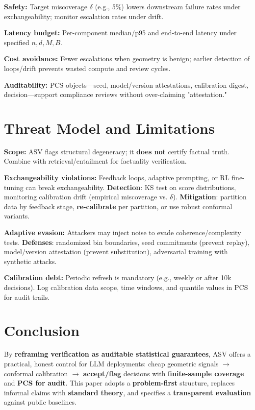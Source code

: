 \documentclass[11pt]{article}
\begin{document}
\textbf{Safety:} Target miscoverage $\delta$ (e.g., 5\%) lowers downstream failure rates under exchangeability; monitor escalation rates under drift.

\textbf{Latency budget:} Per-component median/p95 and end-to-end latency under specified $n, d, M, B$.

\textbf{Cost avoidance:} Fewer escalations when geometry is benign; earlier detection of loops/drift prevents wasted compute and review cycles.

\textbf{Auditability:} PCS objects---seed, model/version attestations, calibration digest, decision---support compliance reviews without over-claiming "attestation."

\section{Threat Model and Limitations}
\label{sec:limitations}

\textbf{Scope:} ASV flags structural degeneracy; it \textbf{does not} certify factual truth. Combine with retrieval/entailment for factuality verification.

\textbf{Exchangeability violations:} Feedback loops, adaptive prompting, or RL fine-tuning can break exchangeability. \textbf{Detection}: KS test on score distributions, monitoring calibration drift (empirical miscoverage vs. $\delta$). \textbf{Mitigation}: partition data by feedback stage, \textbf{re-calibrate} per partition, or use robust conformal variants.

\textbf{Adaptive evasion:} Attackers may inject noise to evade coherence/complexity tests. \textbf{Defenses}: randomized bin boundaries, seed commitments (prevent replay), model/version attestation (prevent substitution), adversarial training with synthetic attacks.

\textbf{Calibration debt:} Periodic refresh is mandatory (e.g., weekly or after 10k decisions). Log calibration data scope, time windows, and quantile values in PCS for audit trails.

\section{Conclusion}
\label{sec:conclusion}

By \textbf{reframing verification as auditable statistical guarantees}, ASV offers a practical, honest control for LLM deployments: cheap geometric signals $\rightarrow$ conformal calibration $\rightarrow$ \textbf{accept/flag} decisions with \textbf{finite-sample coverage} and \textbf{PCS for audit}. This paper adopts a \textbf{problem-first} structure, replaces informal claims with \textbf{standard theory}, and specifies a \textbf{transparent evaluation} against public baselines.
\end{document}

